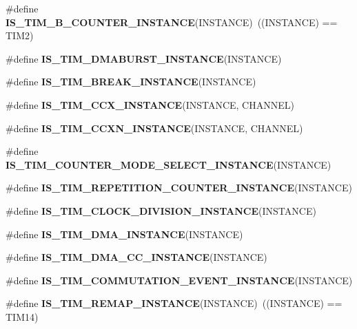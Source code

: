\begin{DoxyCompactItemize}
\mbox{\label{group___exported__macro_gac41867bf288927ff8ff10a85e67a591b}} 
\#define {\bfseries I\+S\+\_\+\+T\+I\+M\+\_\+B\+\_\+\+C\+O\+U\+N\+T\+E\+R\+\_\+\+I\+N\+S\+T\+A\+N\+CE}(I\+N\+S\+T\+A\+N\+CE)~((I\+N\+S\+T\+A\+N\+CE) == T\+I\+M2)
\item 
\#define {\bfseries I\+S\+\_\+\+T\+I\+M\+\_\+\+D\+M\+A\+B\+U\+R\+S\+T\+\_\+\+I\+N\+S\+T\+A\+N\+CE}(I\+N\+S\+T\+A\+N\+CE)
\item 
\#define {\bfseries I\+S\+\_\+\+T\+I\+M\+\_\+\+B\+R\+E\+A\+K\+\_\+\+I\+N\+S\+T\+A\+N\+CE}(I\+N\+S\+T\+A\+N\+CE)
\item 
\#define {\bfseries I\+S\+\_\+\+T\+I\+M\+\_\+\+C\+C\+X\+\_\+\+I\+N\+S\+T\+A\+N\+CE}(I\+N\+S\+T\+A\+N\+CE,  C\+H\+A\+N\+N\+EL)
\item 
\#define {\bfseries I\+S\+\_\+\+T\+I\+M\+\_\+\+C\+C\+X\+N\+\_\+\+I\+N\+S\+T\+A\+N\+CE}(I\+N\+S\+T\+A\+N\+CE,  C\+H\+A\+N\+N\+EL)
\item 
\#define {\bfseries I\+S\+\_\+\+T\+I\+M\+\_\+\+C\+O\+U\+N\+T\+E\+R\+\_\+\+M\+O\+D\+E\+\_\+\+S\+E\+L\+E\+C\+T\+\_\+\+I\+N\+S\+T\+A\+N\+CE}(I\+N\+S\+T\+A\+N\+CE)
\item 
\#define {\bfseries I\+S\+\_\+\+T\+I\+M\+\_\+\+R\+E\+P\+E\+T\+I\+T\+I\+O\+N\+\_\+\+C\+O\+U\+N\+T\+E\+R\+\_\+\+I\+N\+S\+T\+A\+N\+CE}(I\+N\+S\+T\+A\+N\+CE)
\item 
\#define {\bfseries I\+S\+\_\+\+T\+I\+M\+\_\+\+C\+L\+O\+C\+K\+\_\+\+D\+I\+V\+I\+S\+I\+O\+N\+\_\+\+I\+N\+S\+T\+A\+N\+CE}(I\+N\+S\+T\+A\+N\+CE)
\item 
\#define {\bfseries I\+S\+\_\+\+T\+I\+M\+\_\+\+D\+M\+A\+\_\+\+I\+N\+S\+T\+A\+N\+CE}(I\+N\+S\+T\+A\+N\+CE)
\item 
\#define {\bfseries I\+S\+\_\+\+T\+I\+M\+\_\+\+D\+M\+A\+\_\+\+C\+C\+\_\+\+I\+N\+S\+T\+A\+N\+CE}(I\+N\+S\+T\+A\+N\+CE)
\item 
\#define {\bfseries I\+S\+\_\+\+T\+I\+M\+\_\+\+C\+O\+M\+M\+U\+T\+A\+T\+I\+O\+N\+\_\+\+E\+V\+E\+N\+T\+\_\+\+I\+N\+S\+T\+A\+N\+CE}(I\+N\+S\+T\+A\+N\+CE)
\item 
\mbox{\label{group___exported__macro_ga6bb03cf116b07bfe1bd527f8ab61a7f9}} 
\#define {\bfseries I\+S\+\_\+\+T\+I\+M\+\_\+\+R\+E\+M\+A\+P\+\_\+\+I\+N\+S\+T\+A\+N\+CE}(I\+N\+S\+T\+A\+N\+CE)~((I\+N\+S\+T\+A\+N\+CE) == T\+I\+M14)
\item 
\mbox{\label{group___exported__macro_ga98ae6698dc54d8441fce553a65bf5429}} 

\end{DoxyCompactItemize}
